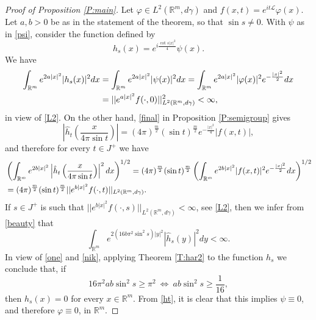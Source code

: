 \documentclass[11pt,a4paper]{amsart}
\def \phi {\varphi}
\def \vf{\varphi}
\newcommand{\Rm}{\mathbb R^m}
\numberwithin{equation}{section}
\numberwithin{equation}{section}
\begin{document}
\begin{proof}[Proof of Proposition \ref{P:main}]
Let $\vf\in L^2(\Rm,d\gamma)$ and $f(x,t) = e^{it\mathscr L}\vf(x)$. Let $a, b>0$ be as in the statement of the theorem, so that $\sin s\not=0$. With $\psi$ as in \eqref{psi}, consider the function defined by
\begin{equation}\label{ht}
h_s(x) = e^{i \frac{\cot s |x|^2}4} \psi(x).
\end{equation}
We have
\begin{align}\label{one}
\int_{\Rm} e^{2a |x|^2} |h_s(x)|^2 dx & = \int_{\Rm} e^{2a |x|^2} |\psi(x)|^2 dx = \int_{\Rm} e^{2a |x|^2} |\vf(x)|^2 e^{- \frac{|x|^2}{2}}dx
\\
& =  ||e^{a |x|^2} f(\cdot,0)||^2_{L^2(\Rm,d\gamma)} < \infty,
\notag
\end{align}
in view of \eqref{L2}. On the other hand, \eqref{final} in Proposition \ref{P:semigroup} gives  
\begin{equation*}
\left|\hat h_t\left(\frac{x}{4 \pi \sin t}\right)\right| = (4\pi
)^{\frac{m}{2}} (\sin t)^{\frac m2} e^{- \frac{|x|^2}{4}} |f(x,t)|,
\end{equation*}
and therefore for every $t\in J^+$ we have
\begin{align}\label{beauty}
& \left(\int_{\Rm} e^{2b |x|^2} \left|\hat h_t\left(\frac{x}{4 \pi \sin t}\right)\right|^2 dx\right)^{1/2} 
 = (4\pi
)^{\frac{m}{2}} (\sin t)^{\frac m2} \left(\int_{\Rm} e^{2b |x|^2} |f(x,t)|^2 e^{- \frac{|x|^2}{2}} dx\right)^{1/2}
\\
& = (4\pi
)^{\frac{m}{2}} (\sin t)^{\frac m2} ||e^{b |x|^2} f(\cdot,t)||_{L^2(\Rm,d\gamma)}.
\notag
\end{align}
If $s\in J^+$ is such that $||e^{b |x|^2} f(\cdot,s)||_{L^2(\Rm,d\gamma)} < \infty$, see \eqref{L2}, then we infer from \eqref{beauty} that 
\begin{equation}\label{nik}
\int_{\Rm} e^{2(16 b \pi^2 \sin^2 s) |y|^2} |\hat h_s(y)|^2 dy < \infty.
\end{equation}
In view of \eqref{one} and \eqref{nik}, applying Theorem \ref{T:har2} to the function $h_s$ we conclude that, if 
\[
16 \pi^2 a b  \sin^2 s \ge \pi^2\ \Longleftrightarrow\  a b \sin^2 s  \ge \frac{1}{16},
\]
then $h_s(x) = 0$ for every $x\in \Rm$. From \eqref{ht}, it is clear that this implies $\psi \equiv 0$, and therefore $\phi \equiv 0$, in $\Rm$.


\end{proof}



\end{document}
